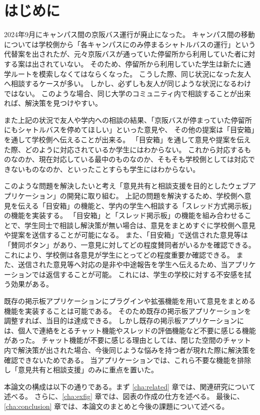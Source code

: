 \documentclass[main]{subfiles}
\begin{document}
\chapter{はじめに}
\label{cha:intro}

2024年9月にキャンパス間の京阪バス運行が廃止になった。
キャンパス間の移動については学校側から「各キャンパスにのみ停まるシャトルバスの運行」という代替案を出されたが、元々京阪バスが通っていた停留所から利用していた者に対する案は出されていない。
そのため、停留所から利用していた学生は新たに通学ルートを模索しなくてはならくなった。
こうした際、同じ状況になった友人へ相談するケースが多い。
しかし、必ずしも友人が同じような状況になるわけではない。
このような場合、同じ大学のコミュニティ内で相談することが出来れば、解決策を見つけやすい。

また上記の状況で友人や学内への相談の結果、「京阪バスが停まっていた停留所にもシャトルバスを停めてほしい」といった意見や、
その他の提案は「目安箱」を通して学校側へ伝えることが出来る。
「目安箱」を通して意見や提案を伝えた際、どのように対応されているか学生にはわからない。
これから対応するものなのか、現在対応している最中のものなのか、そもそも学校側としては対応できないものなのか、といったことすらも学生にはわからない。

このような問題を解決したいと考え「意見共有と相談支援を目的としたウェブアプリケーション」の開発に取り組む。
上記の問題を解決するため、学校側へ意見を伝える「目安箱」の機能と、学内の学生へ相談する「スレッド方式掲示板」の機能を実装する。
「目安箱」と「スレッド掲示板」の機能を組み合わせることで、学生同士で相談し解決策が無い場合は、意見をまとめすぐに学校側へ意見や提案を送信することが可能になる。
また、「目安箱」で送信された意見等は「賛同ボタン」があり、一意見に対してどの程度賛同者がいるかを確認できる。
これにより、学校側は各意見が学生にとってどの程度重要か確認できる。
また、送信された意見等へ対応の是非や中途報告を学生へ伝えるため、当アプリケーションでは返信することが可能。
これには、学生の学校に対する不安感を拭う効果がある。

既存の掲示板アプリケーションにプラグインや拡張機能を用いて意見をまとめる機能を実装することは可能である。
そのため既存の掲示板アプリケーションを調整すれば、当目的は達成できる。
しかし既存の掲示板アプリケーションには、個人で連絡をとるチャット機能やスレッドの評価機能など不要に感じる機能があった。%
チャット機能が不要に感じる理由としては、閉じた空間のチャット内で解決策が出された場合、今後同じような悩みを持つ者が現れた際に解決策を確認できないためである。
当アプリケーションでは、これら不要な機能を排除し「意見共有と相談支援」のみに重点を置いた。

本論文の構成は以下の通りである。まず \ref{cha:related} 章では、関連研究について述べる。
さらに、\ref{cha:exfig} 章では、図表の作成の仕方を述べる。
最後に、\ref{cha:conclusion} 章では、本論文のまとめと今後の課題について述べる。
\end{document}
